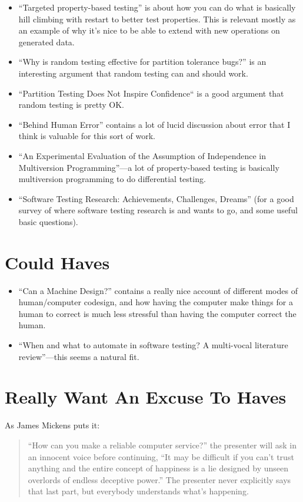 \begin{itemize}
\item ``Targeted property-based testing''\cite{DBLP:conf/issta/LoscherS17} is about how you can do what is basically hill climbing with restart to better test properties.
This is relevant mostly as an example of why it's nice to be able to extend with new operations on generated data.
\item ``Why is random testing effective for partition tolerance bugs?''\cite{DBLP:journals/pacmpl/MajumdarN18} is an interesting argument that random testing can and should work.
\item ``Partition Testing Does Not Inspire Confidence``\cite{DBLP:journals/tse/HamletT90} is a good argument that random testing is pretty OK.\ 
\item ``Behind Human Error''\cite{BehindHumanError} contains a lot of lucid discussion about error that I think is valuable for this sort of work.
\item ``An Experimental Evaluation of the Assumption of Independence in Multiversion Programming''\cite{DBLP:journals/tse/KnightL86}---a
lot of property-based testing is basically multiversion programming to do differential testing.
\item ``Software Testing Research: Achievements, Challenges, Dreams''\cite{DBLP:conf/icse/Bertolino07} (for a good survey of where software testing research is and wants to go, and some useful basic questions).
\end{itemize}

\section{Could Haves}

\begin{itemize}
\item ``Can a Machine Design?''\cite{doi:10.1162/07479360152681083} contains a really nice account of different modes of human/computer codesign,
and how having the computer make things for a human to correct is much less stressful than having the computer correct the human.
\item ``When and what to automate in software testing? {A} multi-vocal literature review''\cite{DBLP:journals/infsof/GarousiM16}---this
seems a natural fit.
\end{itemize}

\section{Really Want An Excuse To Haves}

As James Mickens puts it\cite{mickens2014saddest}:

\begin{quote}
``How can you make a reliable computer service?'' the presenter will ask in an innocent voice before continuing,
``It may be difficult if you can’t trust anything and the entire concept of happiness is a lie designed by unseen overlords of endless deceptive power.''
The presenter never explicitly says that last part,
but everybody understands what's happening.
\end{quote}




